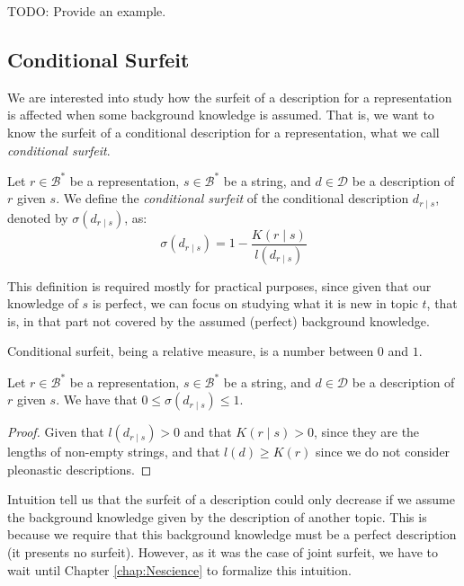 \begin{example}
\label{ex:surfeit_non_comparison}
{\color{red} TODO: Provide an example.}
\end{example}


%
%

\subsection{Conditional Surfeit}

We are interested into study how the surfeit of a description for a representation is affected when some background knowledge is assumed. That is, we want to know the surfeit of a conditional description for a representation, what we call \emph{conditional surfeit}.

\begin{definition}
Let $r \in \mathcal{B}^\ast$ be a representation, $s \in \mathcal{B}^\ast$ be a string, and $d \in \mathcal{D}$ be a description of $r$ given $s$. We define the \emph{conditional surfeit} of the conditional description $d_{r \mid s}$, denoted by $\sigma(d_{r \mid s})$, as: 
\[
\sigma(d_{r \mid s}) = 1 - \frac{K\left( r \mid s \right)}{l \left( d_{r \mid s} \right)}
\]
\end{definition}

This definition is required mostly for practical purposes, since given that our knowledge of $s$ is perfect, we can focus on studying what it is new in topic $t$, that is, in that part not covered by the assumed (perfect) background knowledge.

Conditional surfeit, being a relative measure, is a number between $0$ and $1$.

\begin{proposition}
Let $r \in \mathcal{B}^\ast$ be a representation, $s \in \mathcal{B}^\ast$ be a string, and $d \in \mathcal{D}$ be a description of $r$ given $s$. We have that $0 \leq \sigma(d_{r \mid s}) \leq 1$.
\end{proposition}
\begin{proof}
Given that $l \left( d_{r \mid s} \right) > 0$ and that $K\left( r \mid s \right) > 0$, since they are the lengths of non-empty strings, {\color{red} and that $l\left( d \right) \geq K\left( r \right)$ since we do not consider pleonastic descriptions}.

\end{proof}

Intuition tell us that the surfeit of a description could only decrease if we assume the background knowledge given by the description of another topic. This is because we require that this background knowledge must be a perfect description (it presents no surfeit). However, as it was the case of joint surfeit, we have to wait until Chapter \ref{chap:Nescience} to formalize this intuition.


